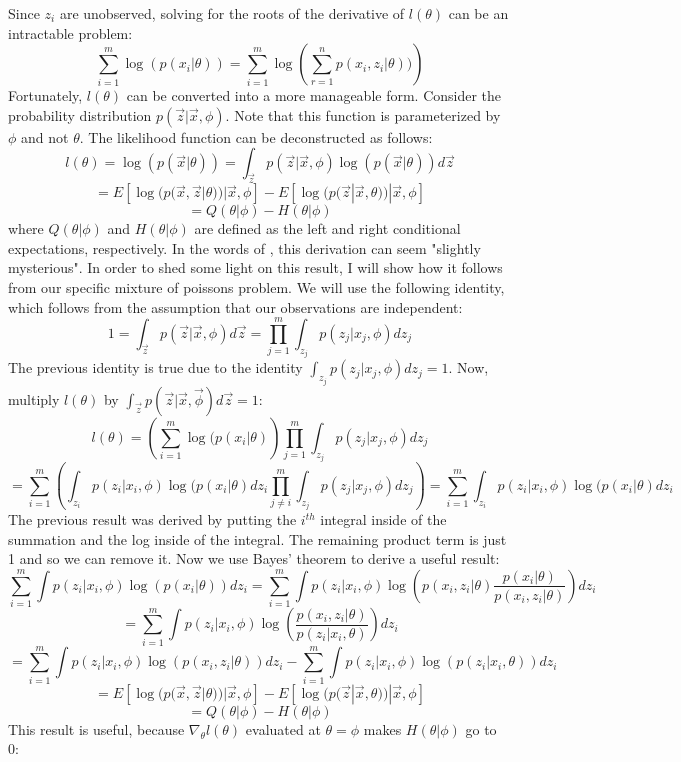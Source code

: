\documentclass[letter,12pt]{article}
\begin{document}
Since $z_i$ are unobserved, solving for the roots of the derivative of $l(\theta)$ can be an intractable problem:
\[
\sum_{i=1}^{m} \log(p(x_i|\theta)) = \sum_{i=1}^{m} \log\left(\sum_{r=1}^{n}p(x_i,z_i|\theta))\right)
\]
Fortunately, $l(\theta)$ can be converted into a more manageable form.  Consider the probability distribution $p(\vec{z}|\vec{x},\phi)$.  Note that this function is parameterized by $\phi$ and not $\theta$.  The likelihood function can be deconstructed as follows:
\[
l(\theta) = \log(p(\vec{x}|\theta)) 
= \int_{\vec{z}}p(\vec{z}|\vec{x},\phi)\log(p(\vec{x}|\theta))d\vec{z}
\]
\[
=
E[\log(p(\vec{x},\vec{z}|\theta))|\vec{x},\phi]
-
E[\log(p(\vec{z}|\vec{x},\theta))|\vec{x},\phi]
\]
\begin{equation} \label{eq:QH}
=Q(\theta|\phi)
-H(\theta|\phi)
\end{equation}
where $Q(\theta|\phi)$ and $H(\theta|\phi)$ are defined as the left and right conditional expectations, respectively.  In the words of \cite{lange1995a}, this derivation can seem "slightly mysterious".  In order to shed some light on this result, I will show how it follows from our specific mixture of poissons problem.  We will use the following identity, which follows from the assumption that our observations are independent:
\[
1 = \int_{\vec{z}}p(\vec{z}|\vec{x},\phi)d\vec{z}
= \prod_{j=1}^{m}\int_{z_j}p(z_j|x_j,\phi)dz_j
\]
The previous identity is true due to the identity $\int_{z_j}p(z_j|x_j,\phi)dz_j=1$.  Now, multiply $l(\theta)$ by $\int_{\vec{z}}p(\vec{z}|\vec{x},\vec{\phi})d\vec{z}=1$:
\[
l(\theta)
= \left( \sum_{i=1}^{m} \log(p(x_i|\theta)\right)
\prod_{j=1}^{m}\int_{z_j}p(z_j|x_j,\phi)dz_j
\]
\[
=  \sum_{i=1}^{m}\left( \int_{z_i} p(z_i|x_i,\phi)\log(p(x_i|\theta)dz_i
\prod_{j\neq i}^{m}\int_{z_j}p(z_j|x_j,\phi)dz_j\right)
=\sum_{i=1}^{m} \int_{z_i} p(z_i|x_i,\phi)\log(p(x_i|\theta)dz_i
\]
The previous result was derived by putting the $i^{th}$ integral inside of the summation and the log inside of the integral.  The remaining product term is just 1 and so we can remove it.  Now we use Bayes' theorem to derive a useful result:
\[
\sum_{i=1}^{m} \int p(z_i|x_i,\phi)\log(p(x_i|\theta))dz_i
= \sum_{i=1}^{m} \int p(z_i|x_i,\phi) \log \left(p(x_i,z_i|\theta)\frac{p(x_i|\theta)}{p(x_i,z_i|\theta)}\right) dz_i
\]
\[
=
\sum_{i=1}^{m} \int p(z_i|x_i,\phi) \log \left(\frac{p(x_i,z_i|\theta)}{p(z_i|x_i,\theta)}\right) dz_i
\]
\[
=
\sum_{i=1}^{m} \int p(z_i|x_i,\phi) \log \left(p(x_i,z_i|\theta)\right) dz_i
-
\sum_{i=1}^{m} \int p(z_i|x_i,\phi) \log \left(p(z_i|x_i,\theta)\right) dz_i
\] 
\[
=
E[\log(p(\vec{x},\vec{z}|\theta))|\vec{x},\phi]
-
E[\log(p(\vec{z}|\vec{x},\theta))|\vec{x},\phi]
\]
\[
=Q(\theta|\phi)
-H(\theta|\phi)
\]
This result is useful, because $\nabla_{\theta}l(\theta)$ evaluated at $\theta = \phi$ makes $H(\theta|\phi)$ go to 0: 
\end{document}
